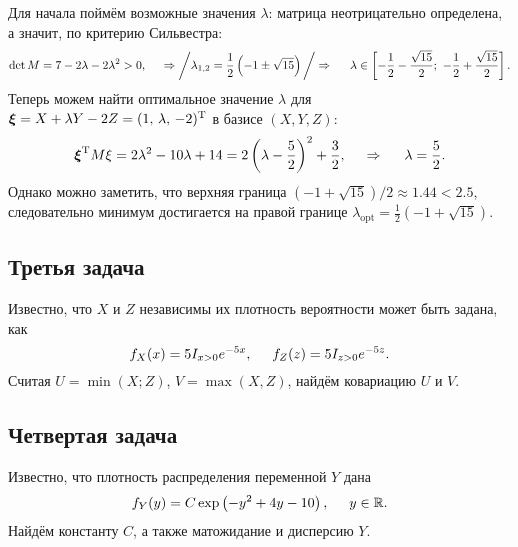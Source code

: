 Для начала поймём возможные значения $\lambda$: матрица неотрицательно определена, а значит, по критерию Сильвестра:
\begin{equation*}
    \det M = 7 - 2 \lambda - 2 \lambda^2 > 0,
    \hspace{0.5cm} \Rightarrow \bigg/
        \lambda_{1,2} = \frac{1}{2}\left(-1\pm \sqrt{15}\right)
    \bigg/
    \Rightarrow
    \hspace{5 mm} 
    \lambda \in \left[
        -\frac{1}{2}-\frac{\sqrt{15}}{2};\ 
        -\frac{1}{2}+\frac{\sqrt{15}}{2}
    \right].
\end{equation*}
Теперь можем найти оптимальное значение $\lambda$ для $\mbox{\boldmath $\xi$} = X + \lambda Y - 2 Z = (1,\, \lambda,\, -2)^{\text{T}}$ в базисе $(X, Y, Z)$:
\begin{equation*}
    \mbox{\boldmath $\xi$}^{\text{T}} M \xi = 2\lambda^2 - 10 \lambda + 14 = 2\left(\lambda- \frac{5}{2}\right)^2 + \frac{3}{2},
    \hspace{0.5cm} \Rightarrow \hspace{0.5cm}
    \lambda = \frac{5}{2}.
\end{equation*}
Однако можно заметить, что верхняя граница $(-1 + \sqrt{15})/2 \approx 1.44 < 2.5$, следовательно минимум достигается на правой границе $\lambda_{\text{opt}} = \frac{1}{2}\left(-1 + \sqrt{15}\right)$. 





\subsection*{Третья задача}
Известно, что $X$ и $Z$ независимы их плотность вероятности может быть задана, как
\begin{equation*}
    f_X (x) = 5 I_{x>0} e^{-5x}, \hspace{5 mm} 
    f_Z (z) = 5 I_{z>0} e^{-5z}.
\end{equation*}
Считая $U = \min(X; Z)$, $V = \max(X, Z)$, найдём ковариацию $U$ и $V$.







\subsection*{Четвертая задача}
Известно, что плотность распределения переменной $Y$ дана
\begin{equation*}
    f_Y(y) = C \exp\left(
        - y^2 + 4y - 10 
    \right), \hspace{5 mm} y \in \mathbb{R}.
\end{equation*}
Найдём константу $C$, а также матожидание и дисперсию $Y$. 

